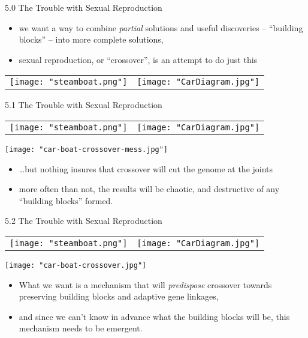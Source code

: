 \documentclass[9pt]{beamer}
\begin{document}
\begin{frame}{5.0 The Trouble with Sexual Reproduction}
\begin{itemize}
\item we want a way to combine \emph{partial} solutions and useful discoveries -- ``building blocks'' -- into more complete solutions,
\item sexual reproduction, or ``crossover'', is an attempt to do just this

\end{itemize}
\begin{tabular}{c|c}
 \texttt{[image: "steamboat.png"]}    &  \texttt{[image: "CarDiagram.jpg"]}
\end{tabular}
    
\end{frame}

\begin{frame}{5.1 The Trouble with Sexual Reproduction}

\begin{tabular}{c|c}
 \texttt{[image: "steamboat.png"]}    &  \texttt{[image: "CarDiagram.jpg"]}
\end{tabular}
\begin{center}
\texttt{[image: "car-boat-crossover-mess.jpg"]}
\end{center}

\begin{itemize}
\item \dots but nothing insures that crossover will cut the genome at the joints
\item more often than not, the results will be chaotic, and destructive of any ``building blocks'' formed.
\end{itemize}

\end{frame}

\begin{frame}{5.2 The Trouble with Sexual Reproduction}

\begin{tabular}{c|c}
 \texttt{[image: "steamboat.png"]}    &  \texttt{[image: "CarDiagram.jpg"]}
\end{tabular}
\begin{center}
\texttt{[image: "car-boat-crossover.jpg"]}
\end{center}

\begin{itemize}
\item What we want is a mechanism that will \emph{predispose} crossover towards preserving building blocks and adaptive gene linkages,
\item and since we can't know in advance what the building blocks will be, this mechanism needs to be emergent.
\end{itemize}
    
\end{frame}
\end{document}
